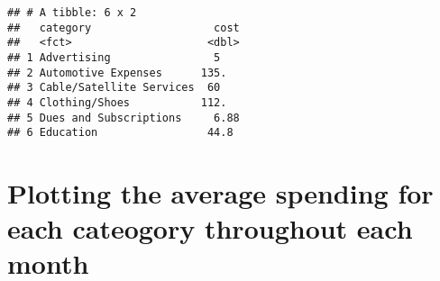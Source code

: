 \documentclass[
]{article}
\newenvironment{Shaded}{\begin{snugshade}}{\end{snugshade}}
\newcommand{\CommentTok}[1]{\textcolor[rgb]{0.56,0.35,0.01}{\textit{#1}}}
\newcommand{\DataTypeTok}[1]{\textcolor[rgb]{0.13,0.29,0.53}{#1}}
\newcommand{\DecValTok}[1]{\textcolor[rgb]{0.00,0.00,0.81}{#1}}
\newcommand{\KeywordTok}[1]{\textcolor[rgb]{0.13,0.29,0.53}{\textbf{#1}}}
\newcommand{\NormalTok}[1]{#1}
\newcommand{\OperatorTok}[1]{\textcolor[rgb]{0.81,0.36,0.00}{\textbf{#1}}}
\newcommand{\StringTok}[1]{\textcolor[rgb]{0.31,0.60,0.02}{#1}}
\begin{document}
\begin{Shaded}
\end{Shaded}

\begin{verbatim}
## # A tibble: 6 x 2
##   category                   cost
##   <fct>                     <dbl>
## 1 Advertising                5   
## 2 Automotive Expenses      135.  
## 3 Cable/Satellite Services  60   
## 4 Clothing/Shoes           112.  
## 5 Dues and Subscriptions     6.88
## 6 Education                 44.8
\end{verbatim}

\hypertarget{plotting-the-average-spending-for-each-cateogory-throughout-each-month}{%
\section{Plotting the average spending for each cateogory throughout
each
month}\label{plotting-the-average-spending-for-each-cateogory-throughout-each-month}}
\end{document}
